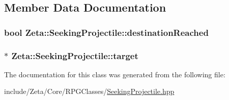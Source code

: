 \subsection{Member Data Documentation}
\hypertarget{classZeta_1_1SeekingProjectile_af08575fbf434bc405367c4a47180fe5f}{
\subsubsection[{destination\+Reached}]{\setlength{\rightskip}{0pt plus 5cm}bool Zeta\+::\+Seeking\+Projectile\+::destination\+Reached\hspace{0.3cm}{\ttfamily [private]}}}\label{classZeta_1_1SeekingProjectile_af08575fbf434bc405367c4a47180fe5f}
\hypertarget{classZeta_1_1SeekingProjectile_af1f24a9e079f103da71f11383f93892a}{
\subsubsection[{target}]{$\ast$ Zeta\+::\+Seeking\+Projectile\+::target\hspace{0.3cm}{\ttfamily [private]}}}\label{classZeta_1_1SeekingProjectile_af1f24a9e079f103da71f11383f93892a}


The documentation for this class was generated from the following file\+:\begin{DoxyCompactItemize}
\item 
include/\+Zeta/\+Core/\+R\+P\+G\+Classes/\hyperlink{SeekingProjectile_8hpp}{Seeking\+Projectile.\+hpp}\end{DoxyCompactItemize}
